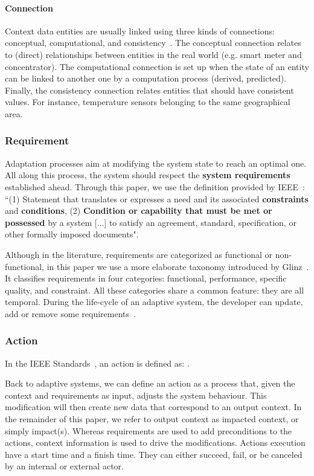 \paragraph{Connection}
Context data entities are usually linked using three kinds of connections: conceptual, computational, and consistency~\cite{DBLP:conf/pervasive/HenricksenIR02, DBLP:journals/percom/BettiniBHINRR10}.
The conceptual connection relates to  (direct) relationships between entities in the real world (e.g. smart meter and concentrator).
The computational connection is set up when the state of an entity can be linked to another one by a computation process (derived, predicted). 
Finally, the consistency connection relates entities that should have consistent values. For instance, temperature sensors belonging to the same geographical area.

\subsubsection{Requirement}
\label{sec:adaptation-req}

Adaptation processes aim at modifying the system state to reach an optimal one.
All along this process, the system should respect the \textbf{system requirements} established ahead. 
Through this paper, we use the definition provided by IEEE~\cite{iso2017systems}: ``(1) Statement that translates or expresses a need and its associated \textbf{constraints} and \textbf{conditions}, (2) \textbf{Condition or capability that must be met or possessed} by a system [...] to satisfy an agreement, standard, specification, or other formally imposed documents".

Although in the literature, requirements are categorized as functional or non-func\-tional, in this paper we use a more elaborate taxonomy introduced by Glinz~\cite{DBLP:conf/re/Glinz07}.
It classifies requirements in four categories: functional, performance, specific quality, and constraint.
All these categories share a common feature: they are all temporal.
During the life-cycle of an adaptive system, the developer can update, add or remove some requirements~\cite{DBLP:conf/icse/ChengA07, pandey2010effective}.

\subsubsection{Action}
In the IEEE Standards~\cite{iso2017systems}, an action is defined as: .

Back to adaptive systems, we can define an action as a process that, given the context and requirements as input, adjusts the system behaviour.
This modification will then create new data that correspond to an output context. In the remainder of this paper, we refer to output context as impacted context, or simply impact(s).
Whereas requirements are used to add preconditions to the actions, context information is used to drive the modifications.
Actions execution have a start time and a finish time. They can either succeed, fail, or be canceled by an internal or external actor.